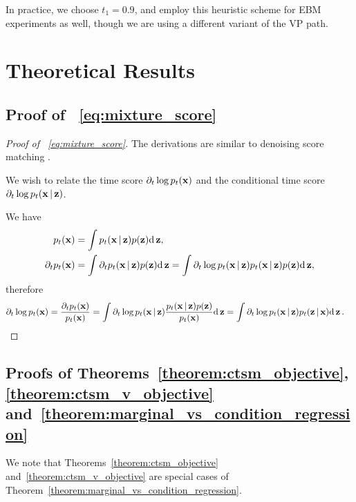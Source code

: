 In practice, we choose $t_{1}=0.9$, and employ this heuristic scheme for EBM experiments as well, though we are using a different variant of the VP path.

\section{Theoretical Results}
\label{app:sec:theory}

\subsection{Proof of ~\eqref{eq:mixture_score}}
\label{app:sec:mixture_score}

\begin{proof}[Proof of ~\eqref{eq:mixture_score}]
The derivations are similar to denoising score matching \citep{vincent2011denoisingscorematching,Bortoli2024}.

We wish to relate the time score $\partial_t \log p_t(\bx)$ and the conditional time score $\partial_t \log p_t(\bx | \bz)$. 

We have
\begin{align}
p_{t}(\bx) 
&= 
\int p_{t}(\bx|\bz)p(\bz)\dd\bz,
\\
\partial_{t} p_{t}(\bx) 
&= 
\int \partial_{t} p_{t}(\bx|\bz)p(\bz)\dd\bz =
\int \partial_{t} \log p_{t}(\bx|\bz) p_t(\bx | \bz) p(\bz)\dd\bz,
\end{align}
therefore
\begin{align}
\partial_{t} \log p_{t}(\bx) &= 
\frac{\partial_t p_t(\bx)}
{p_t(\bx)}
=
\int \partial_{t} \log p_{t}(\bx|\bz) \frac{p_{t}(\bx|\bz)p(\bz)}{p_{t}(\bx)} \dd\bz
=
\int \partial_{t} \log p_{t}(\bx|\bz) p_t(\bz | \bx) \dd\bz.
\end{align}
\end{proof}









\subsection{Proofs of Theorems~\ref{theorem:ctsm_objective}, \ref{theorem:ctsm_v_objective} and~\ref{theorem:marginal_vs_condition_regression}}
\label{app:sec:theorem3_proof}

We note that Theorems~\ref{theorem:ctsm_objective} and~\ref{theorem:ctsm_v_objective} are special cases of Theorem~\ref{theorem:marginal_vs_condition_regression}. 

